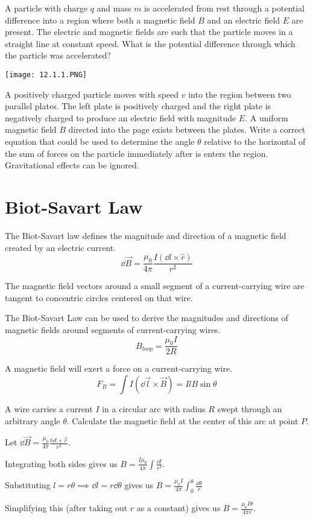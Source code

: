 \documentclass[../em.tex]{subfiles}
\begin{document}
\ex A particle with charge $q$ and mass $m$ is accelerated from rest through a potential difference into a region where both a magnetic field $B$ and an electric field $E$ are present.
The electric and magnetic fields are such that the particle moves in a straight line at constant speed. What is the potential difference through which the particle was accelerated?

\ex \begin{center}
    \texttt{[image: 12.1.1.PNG]}
\end{center}
A positively charged particle moves with speed $v$ into the region between two parallel plates. The left plate is positively charged and the right plate is negatively charged to produce an electric field 
with magnitude $E$. A uniform magnetic field $B$ directed into the page exists between the plates. Write a correct equation that could be used to determine the angle $\theta$ relative to the horizontal of the sum of forces on the particle immediately after is enters the region. Gravitational effects can be ignored.

\pagebreak
\section{Biot-Savart Law}
The Biot-Savart law defines the magnitude and direction of a magnetic field created by an electric current.
\[ \dd \vec{B} = \frac{\mu_0}{4\pi} \frac{I(\dd l\times \hat{r})}{r^2} \]

The magnetic field vectors around a small segment of a current-carrying wire are tangent to concentric circles centered on that wire.

The Biot-Savart Law can be used to derive the magnitudes and directions of magnetic fields around segments of current-carrying wires.
\[ B_{loop} = \frac{\mu_0 I}{2R} \]

A magnetic field will exert a force on a current-carrying wire.
\[ F_B = \int I(\dd \vec{l}\times \vec{B}) = IlB\sin\theta \]

\begin{example}
    A wire carries a current $I$ in a circular arc with radius $R$ swept through an arbitrary angle $\theta$. Calculate the magnetic field at the center of this arc at point $P$.

    Let $\dd \vec{B}=\frac{\mu_0}{4\pi}\frac{t\dd l\times \vec{r}}{r^2}$.

    Integrating both sides gives us $B=\frac{I\mu_0}{4\pi}\int \frac{\dd l}{r^2}$.
    
    Substituting $l=r\theta \implies \dd l = r\dd \theta$ gives us $B=\frac{\mu_0I}{4\pi}\int_0^{\theta} \frac{\dd \theta}{r}$

    Simplifying this (after taking out $r$ as a constant) gives us $B=\frac{\mu_0I\theta}{4\pi r}$.
\end{example}
\end{document}
